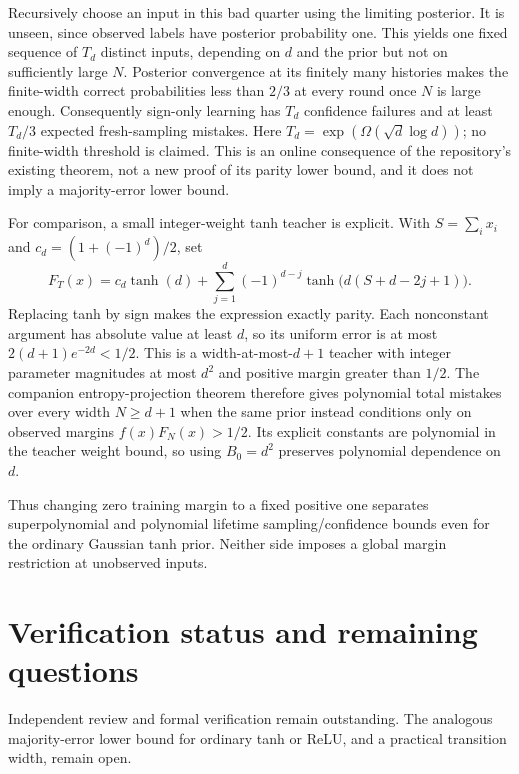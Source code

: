 \documentclass[11pt]{article}
\begin{document}
Recursively choose an input in this bad quarter using the limiting
posterior. It is unseen, since observed labels have posterior probability
one. This yields one fixed sequence of $T_d$ distinct inputs, depending
on $d$ and the prior but not on sufficiently large $N$. Posterior
convergence at its finitely many histories makes the finite-width
correct probabilities less than $2/3$ at every round once $N$ is large
enough. Consequently sign-only learning has $T_d$ confidence failures
and at least $T_d/3$ expected fresh-sampling mistakes. Here
$T_d=\exp(\Omega(\sqrt d\log d))$; no finite-width threshold is claimed.
This is an online consequence of the repository's existing theorem,
not a new proof of its parity lower bound, and it does not imply a
majority-error lower bound.

For comparison, a small integer-weight tanh teacher is explicit. With
$S=\sum_i x_i$ and $c_d=(1+(-1)^d)/2$, set
\[
 F_T(x)=c_d\tanh(d)+\sum_{j=1}^d(-1)^{d-j}
                 \tanh\bigl(d(S+d-2j+1)\bigr).
\]
Replacing tanh by sign makes the expression exactly parity. Each
nonconstant argument has absolute value at least $d$, so its uniform
error is at most $2(d+1)e^{-2d}<1/2$. This is a width-at-most-$d+1$
teacher with integer parameter magnitudes at most $d^2$ and positive
margin greater than $1/2$. The companion entropy-projection theorem
therefore gives polynomial total mistakes over every width $N\ge d+1$
when the same prior instead conditions only on observed margins
$f(x)F_N(x)>1/2$. Its explicit constants are polynomial in the teacher
weight bound, so using $B_0=d^2$ preserves polynomial dependence on $d$.

Thus changing zero training margin to a fixed positive one separates
superpolynomial and polynomial lifetime sampling/confidence bounds even
for the ordinary Gaussian tanh prior. Neither side imposes a global
margin restriction at unobserved inputs.

\section{Verification status and remaining questions}
Independent review and formal verification remain outstanding. The
analogous majority-error lower bound for ordinary tanh or ReLU, and a
practical transition width, remain open.
\end{document}
